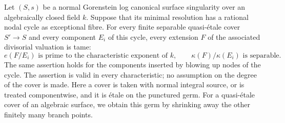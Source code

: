\begin{theorem}
\label{D:cusp-tame}
Let $(S,s)$ be a normal Gorenstein log canonical surface singularity
over an algebraically closed field $k$.  Suppose that its minimal
resolution has a rational nodal cycle as exceptional fibre.
For every finite separable quasi-\'etale cover $S'\to S$ and every
component $E_i$ of this cycle, every extension $F$ of the associated
divisorial valuation is tame:
\[
 e(F/E_i)\text{ is prime to the characteristic exponent of }k,
 \qquad \kappa(F)/\kappa(E_i)\text{ is separable}.
\]
The same assertion holds for the components inserted by blowing
up nodes of the cycle.  The assertion is valid in every
characteristic; no assumption on the degree of the cover is made.
Here a cover is taken with normal integral source, or is treated
componentwise, and it is \'etale on the punctured germ.  For a
quasi-\'etale cover of an algebraic surface, we obtain this germ
by shrinking away the other finitely many branch points.
\end{theorem}
